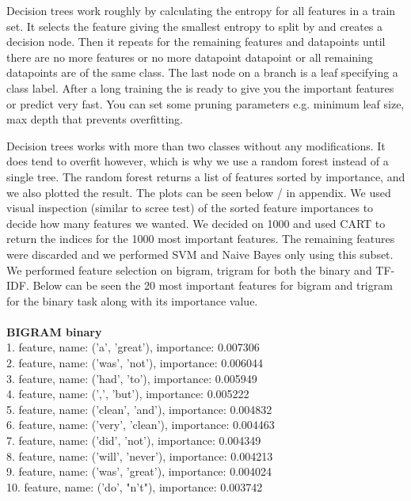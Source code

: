 \documentclass{article}
\begin{document}
Decision trees work roughly by calculating the entropy for all features in a train set. It selects the feature giving the smallest entropy to split by and creates a decision node. 
Then it repeats for the remaining features and datapoints until there are no more features or no more datapoint datapoint or all remaining datapoints are of the same class. The last node on a branch is a leaf specifying a class label. After a long training the is ready to give you the important features or predict very fast. You can set some pruning parameters e.g. minimum leaf size, max depth that prevents overfitting. 

Decision trees works with more than two classes without any modifications. It does tend to overfit however, which is why we use a random forest instead of a single tree. The random forest returns a list of features sorted by importance, and we also plotted the result. The plots can be seen below / in appendix. We used visual inspection (similar to scree test) of the sorted feature importances to decide how many features we wanted. We decided on 1000 and used CART to return the indices for the 1000 most important features. The remaining features were discarded and we performed SVM and Naive Bayes only using this subset. We performed feature selection on bigram, trigram for both the binary and TF-IDF. Below can be seen the 20 most important features for bigram and trigram for the binary task  along with its importance value. 
\\ \\
\textbf{BIGRAM binary}\\
1. feature, name: ('a', 'great'), importance: 0.007306\\
2. feature, name: ('was', 'not'), importance: 0.006044\\
3. feature, name: ('had', 'to'), importance: 0.005949\\
4. feature, name: (',', 'but'), importance: 0.005222\\
5. feature, name: ('clean', 'and'), importance: 0.004832\\
6. feature, name: ('very', 'clean'), importance: 0.004463\\
7. feature, name: ('did', 'not'), importance: 0.004349\\
8. feature, name: ('will', 'never'), importance: 0.004213\\
9. feature, name: ('was', 'great'), importance: 0.004024\\
10. feature, name: ('do', "n't"), importance: 0.003742\\
\end{document}
